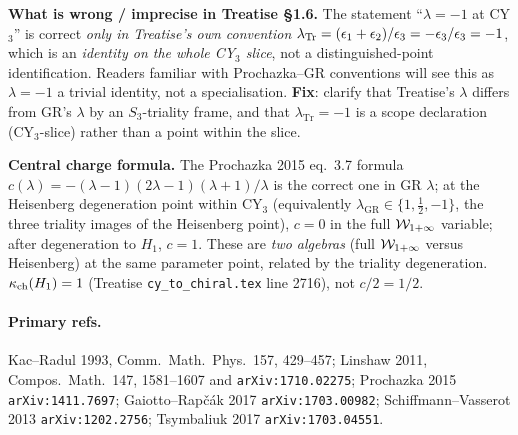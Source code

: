 \textbf{What is wrong / imprecise in Treatise §1.6.} The statement
``$\lambda = -1$ at CY$_3$'' is correct \emph{only in Treatise's own
convention} $\lambda_{\mathrm{Tr}} = (\epsilon_1+\epsilon_2)/\epsilon_3 =
-\epsilon_3/\epsilon_3 = -1$, which is an \emph{identity on the whole CY$_3$
slice}, not a distinguished-point identification. Readers familiar
with Prochazka--GR conventions will see this as $\lambda=-1$ a
trivial identity, not a specialisation. \textbf{Fix}: clarify that
Treatise's $\lambda$ differs from GR's $\lambda$ by an $S_3$-triality
frame, and that $\lambda_{\mathrm{Tr}} = -1$ is a scope declaration
(CY$_3$-slice) rather than a point within the slice.

\textbf{Central charge formula.} The Prochazka 2015 eq.\ 3.7 formula
$c(\lambda) = -(\lambda-1)(2\lambda-1)(\lambda+1)/\lambda$ is the correct
one in GR $\lambda$; at the Heisenberg degeneration point within CY$_3$
(equivalently $\lambda_{\mathrm{GR}} \in \{1, \tfrac12, -1\}$, the three
triality images of the Heisenberg point), $c = 0$ in the full
$\mathcal{W}_{1+\infty}$ variable; after degeneration to $H_1$, $c = 1$. These are
\emph{two algebras} (full $\mathcal{W}_{1+\infty}$ versus Heisenberg) at the same
parameter point, related by the triality degeneration. $\kappa_{\mathrm{ch}}(H_1) = 1$
(Treatise \texttt{cy\_to\_chiral.tex} line 2716), not $c/2 = 1/2$.

\paragraph{Primary refs.}
Kac--Radul 1993, Comm.\ Math.\ Phys.\ 157, 429--457;
Linshaw 2011, Compos.\ Math.\ 147, 1581--1607 and
\texttt{arXiv:1710.02275}; Prochazka 2015 \texttt{arXiv:1411.7697};
Gaiotto--Rapčák 2017 \texttt{arXiv:1703.00982}; Schiffmann--Vasserot
2013 \texttt{arXiv:1202.2756}; Tsymbaliuk 2017 \texttt{arXiv:1703.04551}.
